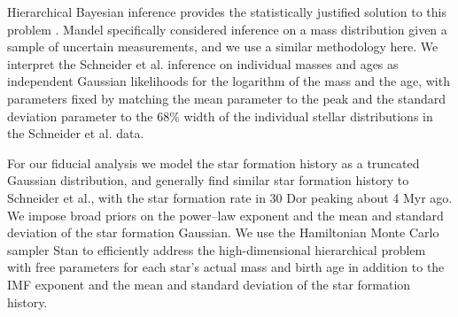 \documentclass[12pt]{article}
\begin{document}


Hierarchical Bayesian inference provides the statistically justified solution to
this problem \cite{Hogg:2010}.  Mandel\cite{Mandel:2010stat} specifically considered
inference on a mass distribution given a sample of uncertain measurements, and
we use a similar methodology here.  We interpret the Schneider et al.\cite{Schneider:2018}
inference on individual masses and ages as independent Gaussian likelihoods for
the logarithm of the mass and the age, with parameters fixed by matching the mean
parameter to the peak and the standard deviation parameter to the 68\% width of
the individual stellar distributions in the Schneider et al.\cite{Schneider:2018} data.

For our fiducial analysis we model the star formation history as a truncated Gaussian distribution, and
generally find similar star formation history to Schneider et al.\cite{Schneider:2018}, with
the star formation rate in 30 Dor peaking about 4 Myr ago.  We impose broad priors
on the power--law exponent and the mean and standard deviation of the star
formation Gaussian.    We use the Hamiltonian Monte Carlo sampler Stan
\cite{STAN} to efficiently address the high-dimensional hierarchical problem
with free parameters for each star's actual mass and birth age in addition to
the IMF exponent and the mean and standard deviation of the star formation
history.
\end{document}
